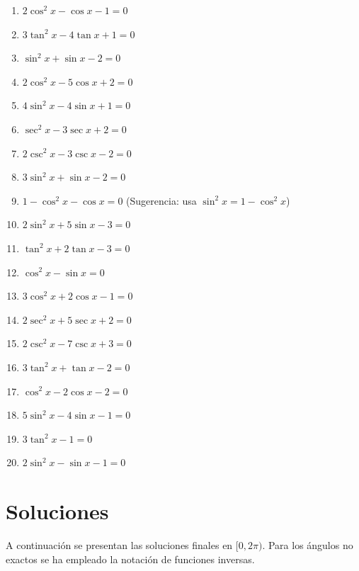 \documentclass[12pt,a4paper]{article}
\begin{document}
\begin{enumerate}[leftmargin=*,label=\arabic*.]

\item $2\cos^2 x - \cos x - 1 = 0$

\item $3\tan^2 x - 4\tan x + 1 = 0$

\item $\sin^2 x + \sin x - 2 = 0$

\item $2\cos^2 x - 5\cos x + 2 = 0$

\item $4\sin^2 x - 4\sin x + 1 = 0$

\item $\sec^2 x - 3\sec x + 2 = 0$

\item $2\csc^2 x - 3\csc x - 2 = 0$

\item $3\sin^2 x + \sin x - 2 = 0$

\item $1 - \cos^2 x - \cos x = 0$ \quad (Sugerencia: usa $\sin^2 x = 1-\cos^2 x$)

\item $2\sin^2 x + 5\sin x - 3 = 0$

\item $\tan^2 x + 2\tan x - 3 = 0$

\item $\cos^2 x - \sin x = 0$

\item $3\cos^2 x + 2\cos x - 1 = 0$

\item $2\sec^2 x + 5\sec x + 2 = 0$

\item $2\csc^2 x - 7\csc x + 3 = 0$

\item $3\tan^2 x + \tan x - 2 = 0$

\item $\cos^2 x - 2\cos x - 2 = 0$

\item $5\sin^2 x - 4\sin x - 1 = 0$

\item $3\tan^2 x - 1 = 0$

\item $2\sin^2 x - \sin x - 1 = 0$
\end{enumerate}

\newpage
\section*{Soluciones}
A continuación se presentan las soluciones finales en $[0,2\pi)$. Para los ángulos no exactos se ha empleado la notación de funciones inversas.
\end{document}

